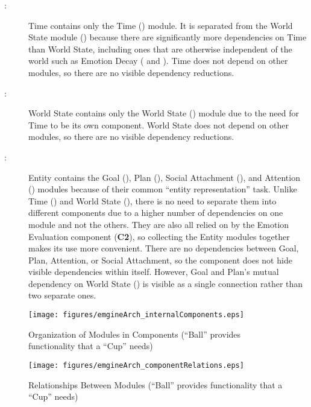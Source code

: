 \begin{description}
    \item [ \mthecpnum \label{cpTime}:] Time contains
    only the Time (\textbf{}) module. It is separated from the
    World State module (\textbf{}) because there are significantly
    more dependencies on Time than World State, including ones that are
    otherwise independent of the world such as Emotion Decay
    (\textbf{} and \textbf{}). Time does not
    depend on other modules, so there are no visible dependency reductions.

    \item [ \mthecpnum \label{cpWorld}:] World State
    contains only the World State (\textbf{}) module due to the
    need for Time to be its own component. World State does not depend on other
    modules, so there are no visible dependency reductions.

    \item [ \mthecpnum \label{cpEntity}:] Entity contains
    the Goal (\textbf{}), Plan (\textbf{}), Social
    Attachment (\textbf{}), and Attention
    (\textbf{}) modules because of their common ``entity
    representation'' task. Unlike Time (\textbf{}) and World State
    (\textbf{}), there is no need to separate them into different
    components due to a higher number of dependencies on one module and not the
    others. They are also all relied on by the Emotion Evaluation component
    (\textbf{C2}), so collecting the Entity modules together makes its use more
    convenient. There are no dependencies between Goal, Plan, Attention, or
    Social Attachment, so the component does not hide visible dependencies
    within itself. However, Goal and Plan's mutual dependency on World State
    (\textbf{}) is visible as a single connection rather than two
    separate ones.

\end{description}

\vspace*{\fill}
\begin{figure}[!ht]
    \centering
    \texttt{[image: figures/emgineArch\_internalComponents.eps]}
    \caption{Organization of Modules in Components (``Ball'' provides
    functionality that a ``Cup'' needs)}
    \label{fig:components}
\end{figure}
\vspace*{\fill}

\begin{figure}[!ht]
    \centering
    \texttt{[image: figures/emgineArch\_componentRelations.eps]}
    \caption{Relationships Between Modules (``Ball'' provides functionality
    that a ``Cup'' needs)}
    \label{fig:componentConnections}
\end{figure}
